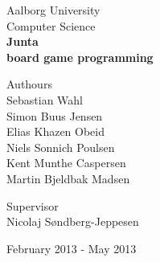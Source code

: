 \begin{titlingpage}
\begin{center}

\vspace*{1.0cm}

\LARGE Aalborg University\\[0.75cm]
\Large Computer Science\\[1.75cm]

\vspace{1.0cm}
{ \fontsize{80.2pt}{80.2pt} \bfseries {} Junta \\}
\vspace{0.15cm}
{ \fontsize{35.2pt}{35.2pt} \bfseries {} board game programming}
\vspace{2.5cm}

\begin{minipage}{13.37cm}
  \begin{flushleft} \large
    \vspace{0pt}
    {\small Authours } \\
    \vspace{0.5cm}
    Sebastian Wahl\\
    Simon Buus Jensen\\
    Elias Khazen Obeid\\
    Niels Sonnich Poulsen\\
    Kent Munthe Caspersen\\
    Martin Bjeldbak Madsen\\
  \end{flushleft}

  \begin{flushright} \large
    \vspace{-120pt}
    {\small Supervisor}\\
    \vspace{0.5cm}
    Nicolaj Søndberg-Jeppesen
  \end{flushright}
\end{minipage}

\vfill

{\large February 2013 - May 2013}
\end{center}
\end{titlingpage}
